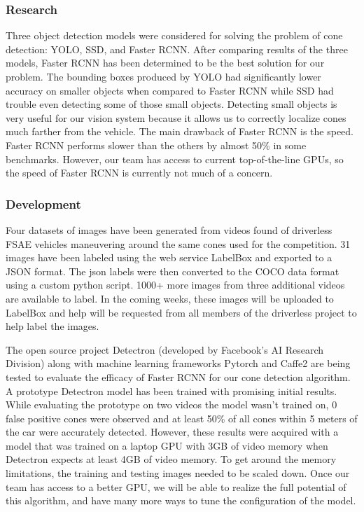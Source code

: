 \documentclass[10pt, onecolumn, draftclsnofoot, letterpaper,compsoc]{IEEEtran}
\begin{document}
\subsubsection{Research}
Three object detection models were considered for solving the problem of cone detection: YOLO, SSD, and Faster RCNN. After comparing results of the three models, Faster RCNN has been determined to be the best solution for our problem. The bounding boxes produced by YOLO had significantly lower accuracy on smaller objects when compared to Faster RCNN while SSD had trouble even detecting some of those small objects. Detecting small objects is very useful for our vision system because it allows us to correctly localize cones much farther from the vehicle. The main drawback of Faster RCNN is the speed. Faster RCNN performs slower than the others by almost 50\% in some benchmarks. However, our team has access to current top-of-the-line GPUs, so the speed of Faster RCNN is currently not much of a concern.

\subsubsection{Development}
Four datasets of images have been generated from videos found of driverless FSAE vehicles maneuvering around the same cones used for the competition. 31 images have been labeled using the web service LabelBox and exported to a JSON format. The json labels were then converted to the COCO data format using a custom python script. 1000+ more images from three additional videos are available to label. In the coming weeks, these images will be uploaded to LabelBox and help will be requested from all members of the driverless project to help label the images.

The open source project Detectron (developed by Facebook's AI Research Division) along with machine learning frameworks Pytorch and Caffe2 are being tested to evaluate the efficacy of Faster RCNN for our cone detection algorithm. A prototype Detectron model has been trained with promising initial results. While evaluating the prototype on two videos the model wasn't trained on, 0 false positive cones were observed and at least 50\% of all cones within 5 meters of the car were accurately detected. However, these results were acquired with a model that was trained on a laptop GPU with 3GB of video memory when Detectron expects at least 4GB of video memory. To get around the memory limitations, the training and testing images needed to be scaled down. Once our team has access to a better GPU, we will be able to realize the full potential of this algorithm, and have many more ways to tune the configuration of the model.
\end{document}

